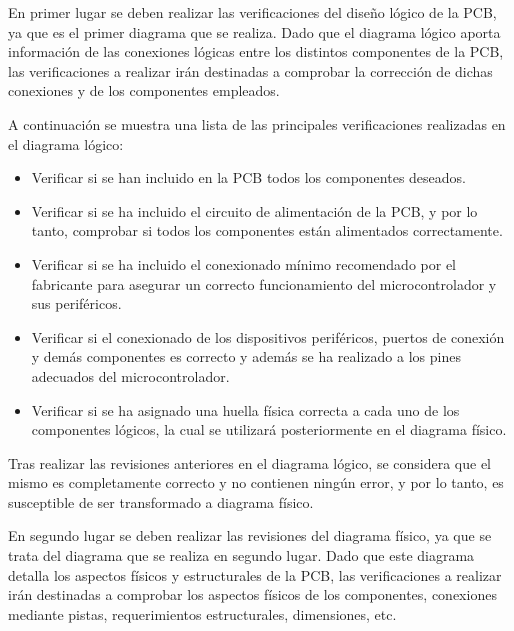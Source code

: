 En primer lugar se deben realizar las verificaciones del diseño lógico de la PCB, ya que es el primer diagrama que se realiza. Dado que el diagrama lógico aporta información de las conexiones lógicas entre los distintos componentes de la PCB, las verificaciones a realizar irán destinadas a comprobar la corrección de dichas conexiones y de los componentes empleados.

A continuación se muestra una lista de las principales verificaciones realizadas en el diagrama lógico:
\begin{itemize}

    \item Verificar si se han incluido en la PCB todos los componentes deseados.
    
    \item Verificar si se ha incluido el circuito de alimentación de la PCB, y por lo tanto, comprobar si todos los componentes están alimentados correctamente.
    
    \item Verificar si se ha incluido el conexionado mínimo recomendado por el fabricante para asegurar un correcto funcionamiento del microcontrolador y sus periféricos.
    
    \item Verificar si el conexionado de los dispositivos periféricos, puertos de conexión y demás componentes es correcto y además se ha realizado a los pines adecuados del microcontrolador.
    
    \item Verificar si se ha asignado una huella física correcta a cada uno de los componentes lógicos, la cual se utilizará posteriormente en el diagrama físico.
    
\end{itemize}

Tras realizar las revisiones anteriores en el diagrama lógico, se considera que el mismo es completamente correcto y no contienen ningún error, y por lo tanto, es susceptible de ser transformado a diagrama físico.

En segundo lugar se deben realizar las revisiones del diagrama físico, ya que se trata del diagrama que se realiza en segundo lugar. Dado que este diagrama detalla los aspectos físicos y estructurales de la PCB, las verificaciones a realizar irán destinadas a comprobar los aspectos físicos de los componentes, conexiones mediante pistas, requerimientos estructurales, dimensiones, etc.

